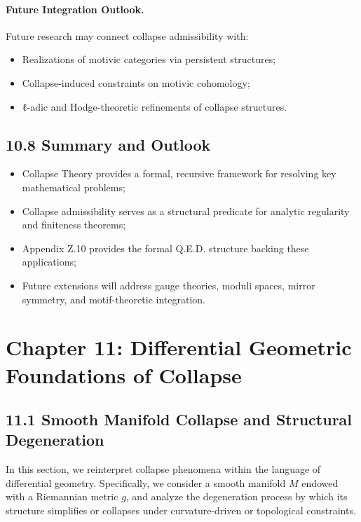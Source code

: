 \documentclass[11pt]{article}
\begin{document}
\paragraph{Future Integration Outlook.}

Future research may connect collapse admissibility with:

\begin{itemize}
    \item Realizations of motivic categories via persistent structures;
    \item Collapse-induced constraints on motivic cohomology;
    \item ℓ-adic and Hodge-theoretic refinements of collapse structures.
\end{itemize}

\subsection*{10.8 Summary and Outlook}

\begin{itemize}
    \item Collapse Theory provides a formal, recursive framework for resolving key mathematical problems;
    \item Collapse admissibility serves as a structural predicate for analytic regularity and finiteness theorems;
    \item Appendix Z.10 provides the formal Q.E.D. structure backing these applications;
    \item Future extensions will address gauge theories, moduli spaces, mirror symmetry, and motif-theoretic integration.
\end{itemize}



\section{Chapter 11: Differential Geometric Foundations of Collapse}

\subsection*{11.1 Smooth Manifold Collapse and Structural Degeneration}

In this section, we reinterpret collapse phenomena within the language of differential geometry. Specifically, we consider a smooth manifold \( M \) endowed with a Riemannian metric \( g \), and analyze the degeneration process by which its structure simplifies or collapses under curvature-driven or topological constraints.
\end{document}
